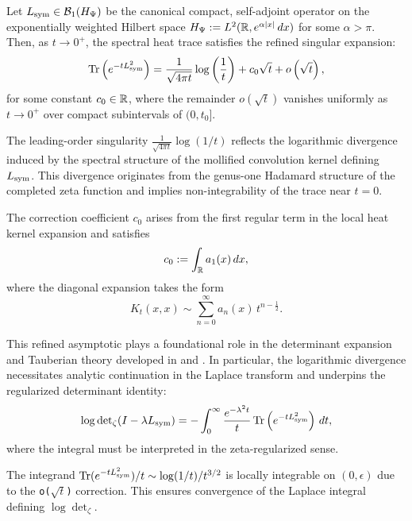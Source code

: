 \begin{proposition}
\label{prop:short_time_heat_expansion}
Let \( L_{\mathrm{sym}} \in \mathcal{B}_1(H_{\Psi}) \) be the canonical compact, self-adjoint operator on the exponentially weighted Hilbert space \( H_{\Psi} := L^2(\mathbb{R}, e^{\alpha |x|} \, dx) \) for some \( \alpha > \pi \). Then, as \( t \to 0^+ \), the spectral heat trace satisfies the refined singular expansion:
\[
\operatorname{Tr}\left(e^{-t L_{\mathrm{sym}}^2}\right)
= \frac{1}{\sqrt{4\pi t}} \log\left( \frac{1}{t} \right)
+ c_0 \sqrt{t} + o\left( \sqrt{t} \right),
\]
for some constant \( c_0 \in \mathbb{R} \), where the remainder \( o(\sqrt{t}) \) vanishes uniformly as \( t \to 0^+ \) over compact subintervals of \( (0, t_0] \).

\medskip
\noindent
The leading-order singularity \( \frac{1}{\sqrt{4\pi t}} \log(1/t) \) reflects the logarithmic divergence induced by the spectral structure of the mollified convolution kernel defining \( L_{\mathrm{sym}} \). This divergence originates from the genus-one Hadamard structure of the completed zeta function and implies non-integrability of the trace near \( t = 0 \).

\medskip
\noindent
The correction coefficient \( c_0 \) arises from the first regular term in the local heat kernel expansion and satisfies
\[
c_0 := \int_{\mathbb{R}} a_1(x) \, dx,
\]
where the diagonal expansion takes the form
\[
K_t(x,x) \sim \sum_{n=0}^{\infty} a_n(x)\, t^{n - \frac{1}{2}}.
\]

\medskip
\noindent
This refined asymptotic plays a foundational role in the determinant expansion and Tauberian theory developed in  and . In particular, the logarithmic divergence necessitates analytic continuation in the Laplace transform and underpins the regularized determinant identity:
\[
\log \det\nolimits_{\zeta}(I - \lambda L_{\mathrm{sym}}) = - \int_0^\infty \frac{e^{-\lambda^2 t}}{t} \operatorname{Tr}\left(e^{-t L_{\mathrm{sym}}^2} \right) \, dt,
\]
where the integral must be interpreted in the zeta-regularized sense.
\end{proposition}

\begin{remark}
The integrand \( \operatorname{Tr}(e^{-tL_{\mathrm{sym}}^2}) / t \sim \log(1/t)/t^{3/2} \) is locally integrable on \( (0,\epsilon) \) due to the \texttt{o(\( \sqrt{t} \))} correction. This ensures convergence of the Laplace integral defining \( \log \det_\zeta \).
\end{remark}
